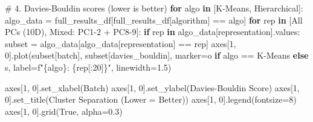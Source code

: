 \documentclass[
  letterpaper,
  DIV=11,
  numbers=noendperiod]{scrartcl}
\newenvironment{Shaded}{\begin{snugshade}}{\end{snugshade}}
\newcommand{\CommentTok}[1]{\textcolor[rgb]{0.37,0.37,0.37}{#1}}
\newcommand{\ControlFlowTok}[1]{\textcolor[rgb]{0.00,0.23,0.31}{\textbf{#1}}}
\newcommand{\DecValTok}[1]{\textcolor[rgb]{0.68,0.00,0.00}{#1}}
\newcommand{\FloatTok}[1]{\textcolor[rgb]{0.68,0.00,0.00}{#1}}
\newcommand{\KeywordTok}[1]{\textcolor[rgb]{0.00,0.23,0.31}{\textbf{#1}}}
\newcommand{\NormalTok}[1]{\textcolor[rgb]{0.00,0.23,0.31}{#1}}
\newcommand{\OperatorTok}[1]{\textcolor[rgb]{0.37,0.37,0.37}{#1}}
\newcommand{\SpecialCharTok}[1]{\textcolor[rgb]{0.37,0.37,0.37}{#1}}
\newcommand{\SpecialStringTok}[1]{\textcolor[rgb]{0.13,0.47,0.30}{#1}}
\newcommand{\StringTok}[1]{\textcolor[rgb]{0.13,0.47,0.30}{#1}}
\newcommand{\VariableTok}[1]{\textcolor[rgb]{0.07,0.07,0.07}{#1}}
\renewenvironment{Shaded}{%
  \begin{tcolorbox}[%
    enhanced,%
    colback=codebg,%
    colframe=codebg,%
    borderline west={3pt}{0pt}{sectionblue},%
    fontupper=\small\ttfamily,%
    boxrule=0pt,%
    arc=0pt,%
    boxsep=5pt,%
    left=2mm,%
    right=2mm,%
    top=2mm,%
    bottom=2mm%
  ]%
}{%
  \end{tcolorbox}%
}
\begin{document}
\begin{Shaded}
\begin{Highlighting}[]
\CommentTok{\# 4. Davies{-}Bouldin scores (lower is better)}
\ControlFlowTok{for}\NormalTok{ algo }\KeywordTok{in}\NormalTok{ [}\StringTok{\textquotesingle{}K{-}Means\textquotesingle{}}\NormalTok{, }\StringTok{\textquotesingle{}Hierarchical\textquotesingle{}}\NormalTok{]:}
\NormalTok{    algo\_data }\OperatorTok{=}\NormalTok{ full\_results\_df[full\_results\_df[}\StringTok{\textquotesingle{}algorithm\textquotesingle{}}\NormalTok{] }\OperatorTok{==}\NormalTok{ algo]}
    \ControlFlowTok{for}\NormalTok{ rep }\KeywordTok{in}\NormalTok{ [}\StringTok{\textquotesingle{}All PCs (10D)\textquotesingle{}}\NormalTok{, }\StringTok{\textquotesingle{}Mixed: PC1{-}2 + PC8{-}9\textquotesingle{}}\NormalTok{]:}
        \ControlFlowTok{if}\NormalTok{ rep }\KeywordTok{in}\NormalTok{ algo\_data[}\StringTok{\textquotesingle{}representation\textquotesingle{}}\NormalTok{].values:}
\NormalTok{            subset }\OperatorTok{=}\NormalTok{ algo\_data[algo\_data[}\StringTok{\textquotesingle{}representation\textquotesingle{}}\NormalTok{] }\OperatorTok{==}\NormalTok{ rep]}
\NormalTok{            axes[}\DecValTok{1}\NormalTok{, }\DecValTok{0}\NormalTok{].plot(subset[}\StringTok{\textquotesingle{}batch\textquotesingle{}}\NormalTok{], subset[}\StringTok{\textquotesingle{}davies\_bouldin\textquotesingle{}}\NormalTok{], }
\NormalTok{                          marker}\OperatorTok{=}\StringTok{\textquotesingle{}o\textquotesingle{}} \ControlFlowTok{if}\NormalTok{ algo }\OperatorTok{==} \StringTok{\textquotesingle{}K{-}Means\textquotesingle{}} \ControlFlowTok{else} \StringTok{\textquotesingle{}s\textquotesingle{}}\NormalTok{,}
\NormalTok{                          label}\OperatorTok{=}\SpecialStringTok{f"}\SpecialCharTok{\{}\NormalTok{algo}\SpecialCharTok{\}}\SpecialStringTok{: }\SpecialCharTok{\{}\NormalTok{rep[:}\DecValTok{20}\NormalTok{]}\SpecialCharTok{\}}\SpecialStringTok{"}\NormalTok{, linewidth}\OperatorTok{=}\FloatTok{1.5}\NormalTok{)}

\NormalTok{axes[}\DecValTok{1}\NormalTok{, }\DecValTok{0}\NormalTok{].set\_xlabel(}\StringTok{\textquotesingle{}Batch\textquotesingle{}}\NormalTok{)}
\NormalTok{axes[}\DecValTok{1}\NormalTok{, }\DecValTok{0}\NormalTok{].set\_ylabel(}\StringTok{\textquotesingle{}Davies{-}Bouldin Score\textquotesingle{}}\NormalTok{)}
\NormalTok{axes[}\DecValTok{1}\NormalTok{, }\DecValTok{0}\NormalTok{].set\_title(}\StringTok{\textquotesingle{}Cluster Separation (Lower = Better)\textquotesingle{}}\NormalTok{)}
\NormalTok{axes[}\DecValTok{1}\NormalTok{, }\DecValTok{0}\NormalTok{].legend(fontsize}\OperatorTok{=}\DecValTok{8}\NormalTok{)}
\NormalTok{axes[}\DecValTok{1}\NormalTok{, }\DecValTok{0}\NormalTok{].grid(}\VariableTok{True}\NormalTok{, alpha}\OperatorTok{=}\FloatTok{0.3}\NormalTok{)}


\end{Highlighting}
\end{Shaded}
\end{document}
